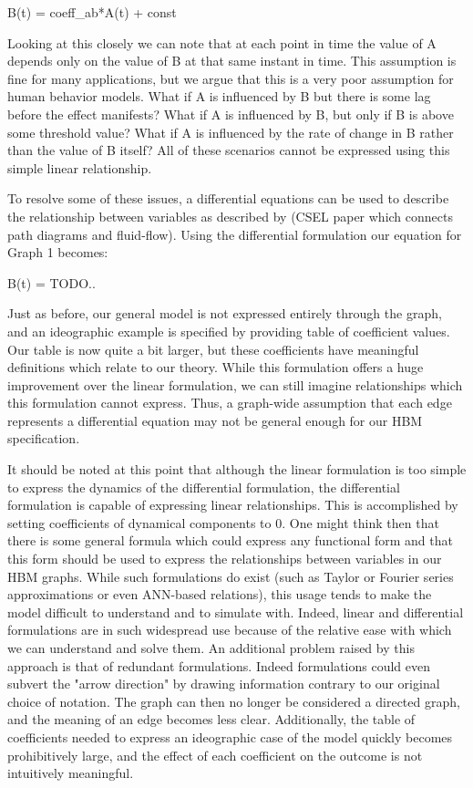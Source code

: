 B(t) = coeff_ab*A(t) + const

Looking at this closely we can note that at each point in time the value of A depends only on the value of B at that same instant in time.
This assumption is fine for many applications, but we argue that this is a very poor assumption for human behavior models. What if A is influenced by B but there is some lag before the effect manifests?
What if A is influenced by B, but only if B is above some threshold value? What if A is influenced by the rate of change in B rather than the value of B itself? All of these scenarios cannot be expressed using this simple linear relationship. 

To resolve some of these issues, a differential equations can be used to describe the relationship between variables as described by (CSEL paper which connects path diagrams and fluid-flow). Using the differential formulation our equation for Graph 1 becomes:

B(t) = TODO..

Just as before, our general model is not expressed entirely through the graph, and an ideographic example is specified by providing table of coefficient values.
Our table is now quite a bit larger, but these coefficients have meaningful definitions which relate to our theory.
While this formulation offers a huge improvement over the linear formulation, we can still imagine relationships which this formulation cannot express.
Thus, a graph-wide assumption that each edge represents a differential equation may not be general enough for our HBM specification. 

It should be noted at this point that although the linear formulation is too simple to express the dynamics of the differential formulation, the differential formulation is capable of expressing linear relationships.
This is accomplished by setting coefficients of dynamical components to 0.
One might think then that there is some general formula which could express any functional form and that this form should be used to express the relationships between variables in our HBM graphs.
While such formulations do exist (such as Taylor or Fourier series approximations or even ANN-based relations), this usage tends to make the model difficult to understand and to simulate with.
Indeed, linear and differential formulations are in such widespread use because of the relative ease with which we can understand and solve them. An additional problem raised by this approach is that of redundant formulations.
Indeed formulations could even subvert the "arrow direction" by drawing information contrary to our original choice of notation.
The graph can then no longer be considered a directed graph, and the meaning of an edge becomes less clear.
Additionally, the table of coefficients needed to express an ideographic case of the model quickly becomes prohibitively large, and the effect of each coefficient on the outcome is not intuitively meaningful.


